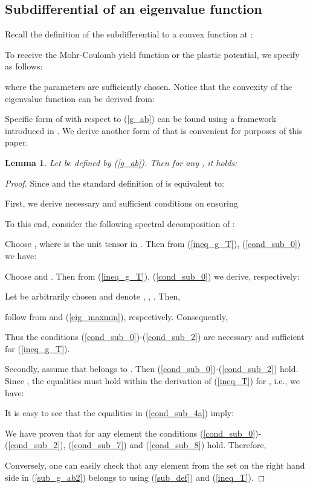 \documentclass[a4paper,12pt]{article}
\newtheorem{lem}{Lemma}[section]
\theoremstyle{remark}
\numberwithin{equation}{section}
\begin{document}
\subsection{Subdifferential of an eigenvalue function}
\label{subsec_subdif}

Recall the definition of the subdifferential to a convex function  at :

To receive the Mohr-Coulomb yield function or the plastic potential, we specify  as follows:

where the parameters  are sufficiently chosen. Notice that the convexity of the eigenvalue function  can be derived from:

Specific form of  with respect to (\ref{g_ab}) can be found using a framework introduced in \cite[Chapter 2]{Ru06}. We derive another form of  that is convenient for purposes of this paper.

\begin{lem}
Let  be defined by (\ref{g_ab}). Then for any , it holds:

\label{lem_subdif}
\end{lem}

\begin{proof}
Since  and  the standard definition of  is equivalent to:

First, we derive necessary and sufficient conditions on  ensuring

To this end, consider the following spectral decomposition of :

Choose , where  is the unit tensor in . Then from (\ref{ineq_g_T}), (\ref{cond_sub_0}) we have:

Choose  and .  Then from (\ref{ineq_g_T}), (\ref{cond_sub_0}) we derive, respectively:

Let  be arbitrarily chosen and denote , , . Then,

follow from  and (\ref{eig_maxmin}), respectively. Consequently,

Thus the conditions (\ref{cond_sub_0})-(\ref{cond_sub_2}) are necessary and sufficient for (\ref{ineq_g_T}).

Secondly, assume that  belongs to . Then (\ref{cond_sub_0})-(\ref{cond_sub_2}) hold. Since  , the equalities must hold within the derivation of (\ref{ineq_T}) for , i.e., we have:


It is easy to see that the equalities in (\ref{cond_sub_4a}) imply:


We have proven that for any element  the conditions (\ref{cond_sub_0})-(\ref{cond_sub_2}), (\ref{cond_sub_7}) and (\ref{cond_sub_8}) hold. Therefore,

Conversely, one can easily check that any element from the set on the right hand side in (\ref{sub_g_ab2}) belongs to  using (\ref{sub_def}) and (\ref{ineq_T}).
\end{proof}
\end{document}
